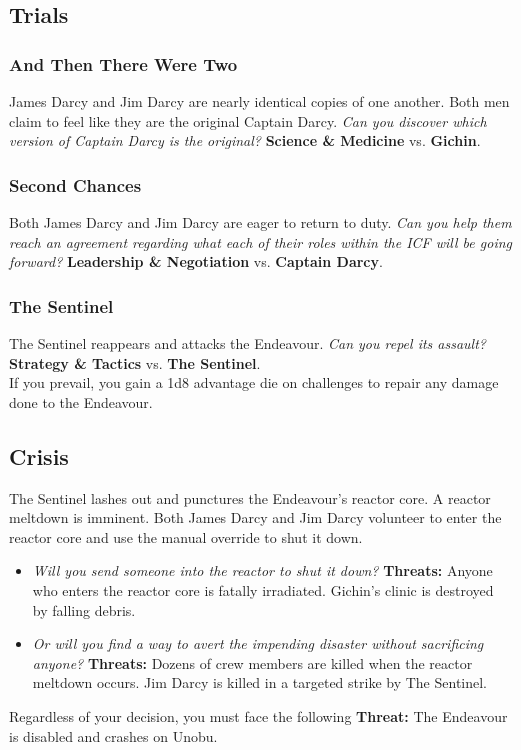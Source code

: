 \documentclass[11pt, a5paper, parskip=half-, DIV=12]{scrartcl}
\begin{document}
\subsection*{Trials}
\subsubsection*{And Then There Were Two}
James Darcy and Jim Darcy are nearly identical copies of one another. Both men claim to feel like they are the original Captain Darcy. \textit{Can you discover which version of Captain Darcy is the original?} \textbf{Science \& Medicine} vs. \textbf{Gichin}.

\subsubsection*{Second Chances}
Both James Darcy and Jim Darcy are eager to return to duty. \textit{Can you help them reach an agreement regarding what each of their roles within the ICF will be going forward?} \textbf{Leadership \& Negotiation} vs. \textbf{Captain Darcy}.

\subsubsection*{The Sentinel}
The Sentinel reappears and attacks the Endeavour. \textit{Can you repel its assault?} \textbf{Strategy \& Tactics} vs. \textbf{The Sentinel}. \\ If you prevail, you gain a 1d8 advantage die on challenges to repair any damage done to the Endeavour. 

\subsection*{Crisis}
The Sentinel lashes out and punctures the Endeavour's reactor core. A reactor meltdown is imminent. Both James Darcy and Jim Darcy volunteer to enter the reactor core and use the manual override to shut it down. 
\begin{itemize}
	\item \textit{Will you send someone into the reactor to shut it down?} \textbf{Threats:} Anyone who enters the reactor core is fatally irradiated. Gichin's clinic is destroyed by falling debris. 
	\item \textit{Or will you find a way to avert the impending disaster without sacrificing anyone?} \textbf{Threats:} Dozens of crew members are killed when the reactor meltdown occurs. Jim Darcy is killed in a targeted strike by The Sentinel.
\end{itemize}
Regardless of your decision, you must face the following \textbf{Threat:} The Endeavour is disabled and crashes on Unobu.
\newpage
\end{document}
